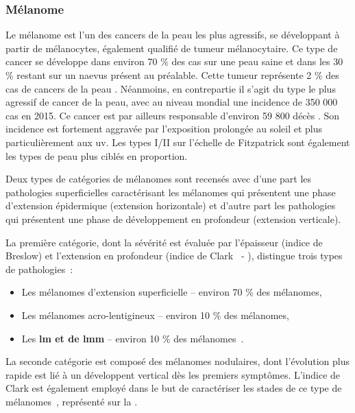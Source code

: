 \subsubsection{Mélanome}
Le mélanome est l'un des cancers de la peau les plus agressifs, se développant à partir de mélanocytes, également qualifié de tumeur mélanocytaire. Ce type de cancer se développe dans environ 70 \% des cas sur une peau saine et dans les 30 \% restant sur un naevus présent au préalable. Cette tumeur représente 2 \% des cas de cancers de la peau \cite{TortoraG;Derrickson2012}. Néanmoins, en contrepartie il s’agit du type le plus agressif de cancer de la peau, avec au niveau mondial une incidence de 350 000 cas en 2015. Ce cancer est par ailleurs responsable d’environ 59 800 décès \cite{Karimkhani2017}. Son incidence est fortement aggravée par l’exposition prolongée au soleil et plus particulièrement aux \gls{uv}. Les types I/II sur l’échelle de Fitzpatrick sont également les types de peau plus ciblés en proportion.\par

Deux types de catégories de mélanomes sont recensés avec d’une part les pathologies superficielles caractérisant les mélanomes qui présentent une phase d’extension épidermique (extension horizontale) et d'autre part les pathologies qui présentent une phase de développement en profondeur (extension verticale).\par

La première catégorie, dont la sévérité est évaluée par l'épaisseur (indice de Breslow) et l'extension en profondeur (indice de Clark~\cite{Clark1969} - ), distingue trois types de pathologies~:
\begin{itemize}
    \item Les mélanomes d'extension superficielle – environ 70 \% des mélanomes,
    \item Les mélanomes acro-lentigineux – environ 10 \% des mélanomes,
    \item Les \textbf{\acrfull{lm} et de \acrfull{lmm}} – environ 10 \% des mélanomes~\cite{LeGal2011}.
\end{itemize}

La seconde catégorie est composé des mélanomes nodulaires, dont l'évolution plus rapide est lié à un développent vertical dès les premiers symptômes. L'indice de Clark est également employé dans le but de caractériser les stades de ce type de mélanomes~\cite{Clark1969}, représenté sur la .\par

